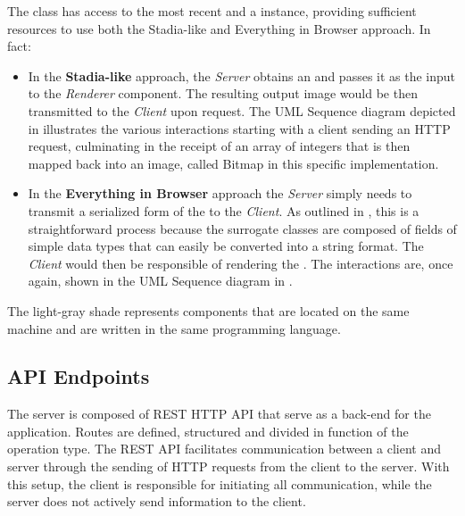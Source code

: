 The  class has access to the most recent  and a  instance, providing sufficient resources to use both the Stadia-like and Everything in Browser approach. In fact:
\begin{itemize}
	\item In the \textbf{Stadia-like} approach, the \textit{Server} obtains an  and passes it as the input to the \textit{Renderer} component. The resulting output image would be then transmitted to the \textit{Client} upon request.
	The UML Sequence diagram depicted in  illustrates the various interactions starting with a client sending an HTTP request, culminating in the receipt of an array of integers that is then mapped back into an image, called Bitmap in this specific implementation.


	\item In the \textbf{Everything in Browser} approach the \textit{Server} simply needs to transmit a serialized form of the  to the \textit{Client}. As outlined in , this is a straightforward process because the surrogate classes are composed of fields of simple data types that can easily be converted into a string format. The \textit{Client} would then be responsible of rendering the . The interactions are, once again, shown in the UML Sequence diagram in .
\end{itemize}
The light-gray shade represents components that are located on the same machine and are written in the same programming language.
\subsection{API Endpoints}
\label{ssec:api-endpoints}
The server is composed of REST HTTP API that serve as a back-end for the application. Routes are defined, structured and divided in function of the operation type. The REST API facilitates communication between a client and server through the sending of HTTP requests from the client to the server. With this setup, the client is responsible for initiating all communication, while the server does not actively send information to the client.\newline

